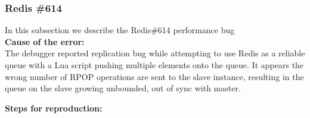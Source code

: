 \subsubsection{Redis \#614}

In this subsection we describe the Redis\#614 performance bug \\

\noindent \textbf{Cause of the error:} \\

The debugger reported replication bug while attempting to use Redis as a reliable queue with a Lua script pushing multiple elements onto the queue. 
It appears the wrong number of RPOP operations are sent to the slave instance, resulting in the queue on the slave growing unbounded, out of sync with master.

\noindent \textbf{Steps for reproduction:} \\

